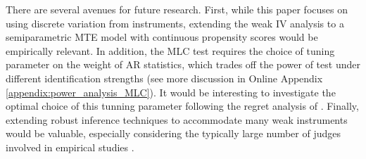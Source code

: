 \documentclass[11pt]{article}
\theoremstyle{definition}
\newcommand{\0}{\ensuremath{\mathbf{0}}}
\begin{document}
\begin{bibunit}
There are several avenues for future research. First, while this paper focuses on using discrete variation from instruments, extending the weak IV analysis to a semiparametric MTE model with continuous propensity scores would be empirically relevant. In addition, the MLC test requires the choice of tuning parameter on the weight of AR statistics, which trades off the power of test under different identification strengths (see more discussion in Online Appendix \ref{appendix:power_analysis_MLC}). It would be interesting to investigate the optimal choice of this tunning parameter following the regret analysis of \cite{andrews:2016}. Finally, extending robust inference techniques to accommodate many weak instruments would be valuable, especially considering the typically large number of judges involved in empirical studies \citep{jochmans:2023}.

\putbib
\end{bibunit}

\appendix
\end{document}
